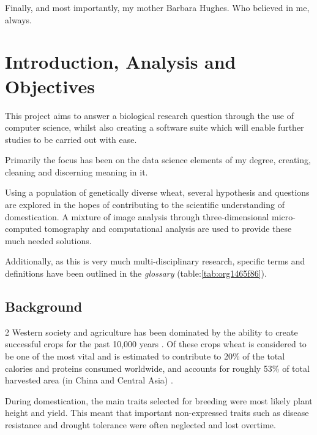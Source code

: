 \documentclass[11pt]{report}
\begin{document}
\vspace{1cm}

Finally, and most importantly, my mother Barbara Hughes. Who believed in me, always.



  \clearpage
  \tableofcontents
  \clearpage
  \listoftables
  \clearpage
  \listoffigures
  \clearpage
  \listofmyequations
  \clearpage
  \listoflistings
  \clearpage

\chapter{Introduction, Analysis and Objectives}
\label{sec:orgfa0b0c3}

This project aims to answer a biological research question through the use of computer science, whilst also creating a software suite which will enable further studies to be carried out with ease.

Primarily the focus has been on the data science elements of my degree, creating, cleaning and discerning meaning in it.

Using a population of genetically diverse wheat, several hypothesis and questions are explored in the hopes of contributing to the scientific understanding of domestication. A mixture of image analysis through three-dimensional micro-computed tomography and computational analysis are used to provide these much needed solutions.

Additionally, as this is very much multi-disciplinary research, specific terms and definitions have been outlined in the \emph{glossary} (table:\ref{tab:org1465f86}).

\section{Background}
\label{sec:orgb19cde0}
2
   Western society and agriculture has been dominated by the ability to create successful crops for the past 10,000 years \cite{Ozkan2002}. Of these crops wheat is considered to be one of the most vital and is estimated to contribute to 20\% of the total calories and proteins consumed worldwide, and accounts for roughly 53\% of total harvested area (in China and Central Asia) \cite{Shiferaw2013}.

During domestication, the main traits selected for breeding were most likely plant height and yield. This meant that important non-expressed traits such as disease resistance and drought tolerance were often neglected and lost overtime.
\end{document}
